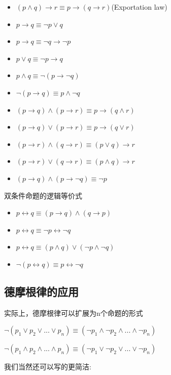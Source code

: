 \documentclass[12pt,a4paper,oneside]{ctexart}
\begin{document}
\begin{itemize}
\item
  \((p\wedge q)\rightarrow r\equiv p\rightarrow(q\rightarrow r)\)(Exportation law)
\item
  \(p\rightarrow q\equiv\neg p\vee q\)
\item
  \(p\rightarrow q\equiv\neg q\rightarrow \neg p\)
\item
  \(p\vee q\equiv \neg p\rightarrow q\)
\item
  \(p\wedge q\equiv \neg(p\rightarrow \neg q)\)
\item
  \(\neg(p\rightarrow q)\equiv p\wedge\neg q\)
\item
  \((p\rightarrow q)\wedge (p\rightarrow r)\equiv p\rightarrow(q\wedge r)\)
\item
  \((p\rightarrow q)\vee(p\rightarrow r)\equiv p\rightarrow(q\vee r)\)
\item
  \((p\rightarrow r)\wedge(q\rightarrow r)\equiv(p\vee q)\rightarrow r\)
\item
  \((p\rightarrow r)\vee(q\rightarrow r)\equiv (p\wedge q)\rightarrow r\)
\item
  \((p\rightarrow q)\wedge(p\rightarrow\neg q)\equiv \neg p\)
\end{itemize}

双条件命题的逻辑等价式

\begin{itemize}
\item
  \(p\leftrightarrow q\equiv(p\rightarrow q)\wedge(q\rightarrow p)\)
\item
  \(p\leftrightarrow q\equiv\neg p\leftrightarrow \neg q\)
\item
  \(p\leftrightarrow q\equiv(p\wedge q)\vee(\neg p\wedge \neg q)\)
\item
  \(\neg(p\leftrightarrow q)\equiv p\leftrightarrow \neg q\)
\end{itemize}

\subsection*{德摩根律的应用}

实际上，德摩根律可以扩展为n个命题的形式

\(\neg(p_1\vee p_2\vee...\vee p_n)\equiv(\neg p_1\wedge\neg p_2\wedge...\wedge\neg p_n)\)

\(\neg(p_1\wedge p_2\wedge...\wedge p_n)\equiv(\neg p_1\vee\neg p_2\vee...\vee\neg p_n)\)

我们当然还可以写的更简洁:
\end{document}
